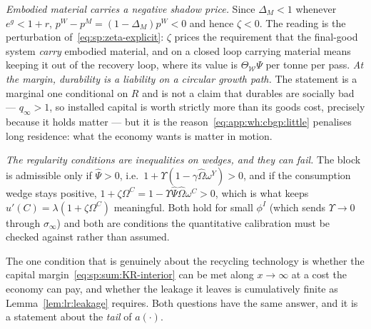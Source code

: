 \emph{Embodied material carries a negative shadow price.} Since $\Delta_M<1$ whenever $e^{g}<1+r$, $p^W-p^M=\left(1-\Delta_M\right)p^W<0$ and hence $\zeta<0$. The reading is the perturbation of~\eqref{eq:sp:zeta-explicit}: $\zeta$ prices the requirement that the final-good system \emph{carry} embodied material, and on a closed loop carrying material means keeping it out of the recovery loop, where its value is $\Theta_{\mathcal W}\Psi$ per tonne per pass. \emph{At the margin, durability is a liability on a circular growth path.} The statement is a marginal one conditional on $R$ and is not a claim that durables are socially bad --- $q_\infty>1$, so installed capital is worth strictly more than its goods cost, precisely because it holds matter --- but it is the reason~\eqref{eq:app:wh:cbgp:little} penalises long residence: what the economy wants is matter in motion.

\emph{The regularity conditions are inequalities on wedges, and they can fail.} The block is admissible only if $\hat\Psi>0$, i.e.\ $1+\Upsilon\left(1-\gamma\hat\Omega\omega^Y\right)>0$, and if the consumption wedge stays positive, $1+\zeta\Omega^C=1-\Upsilon\hat\Psi\hat\Omega\omega^C>0$, which is what keeps $u'\left(C\right)=\lambda\left(1+\zeta\Omega^C\right)$ meaningful. Both hold for small $\phi^I$ (which sends $\Upsilon\to0$ through $\sigma_\infty$) and both are conditions the quantitative calibration must be checked against rather than assumed.

 The one condition that is genuinely about the recycling technology is whether the capital margin~\eqref{eq:sp:sum:KR-interior} can be met along $x\to\infty$ at a cost the economy can pay, and whether the leakage it leaves is cumulatively finite as Lemma~\ref{lem:lr:leakage} requires. Both questions have the same answer, and it is a statement about the \emph{tail} of $a\left(\cdot\right)$.

